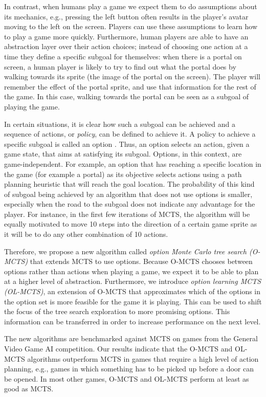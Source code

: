 In contrast, when humans play a game we expect them to do assumptions about its
mechanics, e.g., pressing the left button often results in the player's avatar
moving to the left on the screen. Players can use these assumptions to learn how
to play a game more quickly. Furthermore, human players are able to have an
abstraction layer over their action choices; instead of choosing one action at a
time they define a specific subgoal for themselves: when there is a portal on
screen, a human player is likely to try to find out what the portal does by
walking towards its sprite (the image of the portal on the screen). The player
will remember the effect of the portal sprite, and use that information for the
rest of the game. In this case, walking towards the portal can be seen as a
subgoal of playing the game.

In certain situations, it is clear how such a subgoal can be achieved and a
sequence of actions, or \emph{policy}, can be defined to achieve it. A policy to
achieve a specific subgoal is called an option \cite{sutton1999between}. Thus, an option selects an 
action, given a game state, that aims at satisfying its subgoal. Options, in
this context, are game-independent. For example, an option that has reaching a
specific location in the game (for example a portal) as its objective selects
actions using a path planning heuristic that will reach the goal location. 
The probability of this kind of subgoal being achieved by an algorithm that
does not use options is smaller, especially when the road to the subgoal does
not indicate any advantage for the player. For instance, in the first few
iterations of MCTS, the algorithm will be equally motivated to move 10 steps
into the direction of a certain game sprite as it will be to do any other
combination of 10 actions. 

Therefore, we propose a new algorithm called \emph{option Monte Carlo tree
search (O-MCTS)} that extends MCTS to use options. Because O-MCTS chooses
between options rather than actions when playing a game, we expect it to be able
to plan at a higher level of abstraction. Furthermore, we introduce \emph{option
learning MCTS (OL-MCTS)}, an extension of O-MCTS that approximates which of the
options in the option set is more feasible for the game it is playing. This can
be used to shift the focus of the tree search exploration to more promising
options. This information can be transferred in order to increase performance on
the next level.

The new algorithms are benchmarked against MCTS on games from the General Video
Game AI competition. Our results indicate that the O-MCTS and OL-MCTS algorithms
outperform MCTS in games that require a high level of action planning, e.g.,
games in which something has to be picked up before a door can be opened. In
most other games, O-MCTS and OL-MCTS perform at least as good as MCTS.
